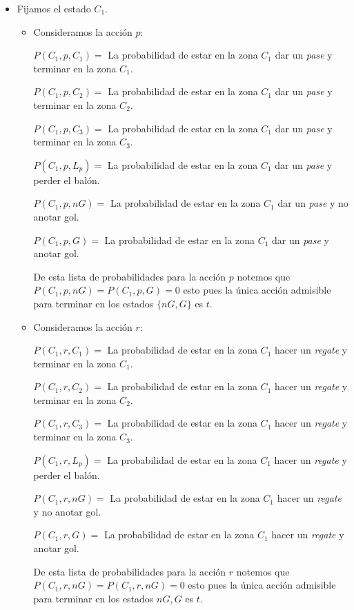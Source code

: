 \documentclass[
  us-letterpaper,
  DIV=11,
  numbers=noendperiod]{scrreprt}
\begin{document}
\begin{itemize}
\item
  Fijamos el estado \(C_1\).

  \begin{itemize}
  \item
    Consideramos la acción \(p\):

    \(P(C_1,p,C_1)=\) La probabilidad de estar en la zona \(C_1\) dar un
    \emph{pase} y terminar en la zona \(C_1\).

    \(P(C_1,p,C_2)=\) La probabilidad de estar en la zona \(C_1\) dar un
    \emph{pase} y terminar en la zona \(C_2\).

    \(P(C_1,p,C_3)=\) La probabilidad de estar en la zona \(C_1\) dar un
    \emph{pase} y terminar en la zona \(C_3\).

    \(P(C_1,p,L_p)=\) La probabilidad de estar en la zona \(C_1\) dar un
    \emph{pase} y perder el balón.

    \(P(C_1,p,nG)=\) La probabilidad de estar en la zona \(C_1\) dar un
    \emph{pase} y no anotar gol.

    \(P(C_1,p,G)=\) La probabilidad de estar en la zona \(C_1\) dar un
    \emph{pase} y anotar gol.

    De esta lista de probabilidades para la acción \(p\) notemos que
    \(P(C_1,p,nG)=P(C_1,p,G)=0\) esto pues la única acción admisible
    para terminar en los estados \(\{nG,G\}\) es \(t\).
  \item
    Consideramos la acción \(r\):

    \(P(C_1,r,C_1)=\) La probabilidad de estar en la zona \(C_1\) hacer
    un \emph{regate} y terminar en la zona \(C_1\).

    \(P(C_1,r,C_2)=\) La probabilidad de estar en la zona \(C_1\) hacer
    un \emph{regate} y terminar en la zona \(C_2\).

    \(P(C_1,r,C_3)=\) La probabilidad de estar en la zona \(C_1\) hacer
    un \emph{regate} y terminar en la zona \(C_3\).

    \(P(C_1,r,L_p)=\) La probabilidad de estar en la zona \(C_1\) hacer
    un \emph{regate} y perder el balón.

    \(P(C_1,r,nG)=\) La probabilidad de estar en la zona \(C_1\) hacer
    un \emph{regate} y no anotar gol.

    \(P(C_1,r,G)=\) La probabilidad de estar en la zona \(C_1\) hacer un
    \emph{regate} y anotar gol.

    De esta lista de probabilidades para la acción \(r\) notemos que
    \(P(C_1,r,nG)=P(C_1,r,nG)=0\) esto pues la única acción admisible
    para terminar en los estados \(nG,G\) es \(t\).


\end{itemize}
\end{itemize}
\end{document}
